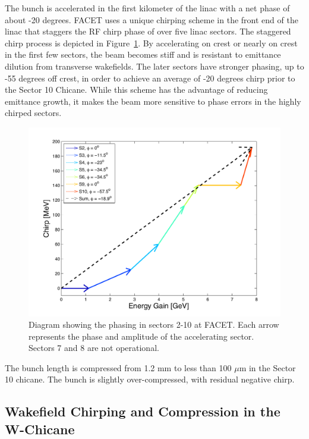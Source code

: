 \documentclass[%
twocolumn,
showpacs,preprintnumbers,
 aps,
prstab,
]{revtex4-1}
\begin{document}
The bunch is accelerated in the first kilometer of the linac with a net phase of about -20 degrees. FACET uses a unique chirping scheme in the front end of the linac that staggers the RF chirp phase of over five linac sectors. The staggered chirp process is depicted in Figure~\ref{stag}. By accelerating on crest or nearly on crest in the first few sectors, the beam becomes stiff and is resistant to emittance dilution from transverse wakefields. The later sectors have stronger phasing, up to -55 degrees off crest, in order to achieve an average of -20 degrees chirp prior to the Sector 10 Chicane. While this scheme has the advantage of reducing emittance growth, it makes the beam more sensitive to phase errors in the highly chirped sectors.

\begin{figure}[hb]
  \includegraphics[width=\columnwidth]{figures/chirp_plot.pdf}
  \caption{Diagram showing the phasing in sectors 2-10 at FACET. Each arrow represents the phase and amplitude of the accelerating sector. Sectors 7 and 8 are not operational.}
  \label{stag}
\end{figure}

The bunch length is compressed from 1.2 mm to less than 100 $\mu$m in the Sector 10 chicane. The bunch is slightly over-compressed, with residual negative chirp.

\subsection{Wakefield Chirping and Compression in the W-Chicane}\label{wakes}
\end{document}
